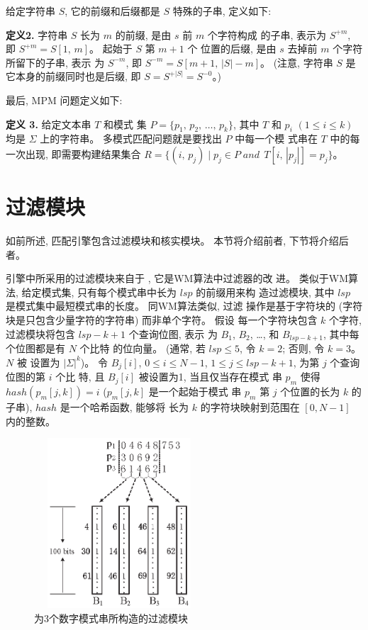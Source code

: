 给定字符串 $S$, 它的前缀和后缀都是 $S$ 特殊的子串, 定义如下:

\textbf{定义2.} 字符串 $S$ 长为 $m$ 的前缀, 是由 $s$ 前 $m$ 个字符构成
的子串, 表示为 $S^{+m}$, 即 $S^{+m}=S[1,\,m]$。  起始于 $S$ 第 $m+1$ 个
位置的后缀, 是由 $s$ 去掉前 $m$ 个字符所留下的子串, 表示
为 $S^{-m}$, 即 $S^{-m} = S[m+1,\,|S|-m]$。 (注意, 字符串 $S$
是它本身的前缀同时也是后缀, 即 $S=S^{+|S|}=S^{-0}$。)

最后, MPM 问题定义如下: 

\textbf{定义 3.} 给定文本串 $T$ 和模式
集 $P=\{p_1,\,p_2,\,\dots,\,p_k\}$, 其中 $T$ 和 $p_i$ $(1 \leq i \leq
k)$ 均是 $\Sigma$ 上的字符串。 多模式匹配问题就是要找出 $P$ 中每一个模
式串在 $T$ 中的每一次出现, 即需要构建结果集合
$R = \{(i,\, p_j)\;|\; p_j \in P\; and\,\; T[i,\,|p_j|]=p_j\}$。


\section{过滤模块}
\label{sec:filter}

如前所述, 匹配引擎包含过滤模块和核实模块。 本节将介绍前者, 下节将介绍后
者。

引擎中所采用的过滤模块来自于 \cite{Lee2013}, 它是WM算法中过滤器的改
进。 类似于WM算法, 给定模式集, 只有每个模式串中长为 $lsp$ 的前缀用来构
造过滤模块, 其中 $lsp$ 是模式集中最短模式串的长度。 同WM算法类似, 过滤
操作是基于字符块的 (字符块是只包含少量字符的字符串) 而非单个字符。 假设
每一个字符块包含 $k$ 个字符, 过滤模块将包含 $lsp-k+1$ 个查询位图, 表示
为 $B_1$, $B_2$, \dots, 和 $B_{lsp-k+1}$, 其中每个位图都是有 $N$ 个比特
的位向量。  (通常, 若 $lsp \leq 5$, 令 $k = 2$; 否则, 令 $k=3$。$N$ 被
设置为 $|\Sigma|^k$)。 令 $B_j[i]$, $0 \leq i \leq N - 1$,
$1 \leq j \leq lsp-k+1$, 为第 $j$ 个查询位图的第 $i$ 个比
特, 且 $B_j[i]$ 被设置为1, 当且仅当存在模式
串 $p_m$ 使得 $hash(p_m[j,k]) = i$ ($p_m[j,k]$ 是一个起始于模式
串 $p_m$ 第 $j$ 个位置的长为 $k$ 的子串), $hash$ 是一个哈希函数, 能够将
长为 $k$ 的字符块映射到范围在 $[0, N-1]$ 内的整数。

\begin{figure}[H]
  \centering
  \includegraphics[height=2.5in, width=2.5in]{figures/2_MPM/filter.eps}
  \caption{为3个数字模式串所构造的过滤模块}
  \label{fig:filter}
\end{figure}

